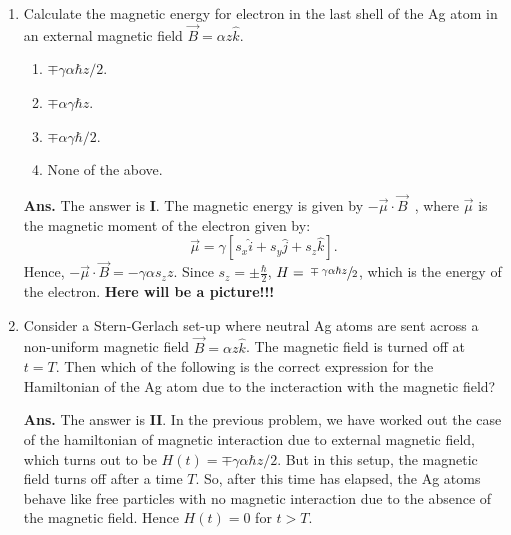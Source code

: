 \documentclass[12pt]{article}
\newcommand\tbf[1]{\textbf{#1}}
\newcommand\hhalf{\frac{\hbar}{2}}
\newcommand\tans{\tbf{Ans. }}
\newcommand\none{None of the above.}
\newcommand\sg{Stern-Gerlach }
\newcommand\h[1]{\hat{#1}}
\newcommand\dprod[2]{\vec{#1}\cdot\vec{#2}}
\begin{document}
\begin{enumerate}[\bf 1.]
\vspace{1cm}
\item Calculate the magnetic energy for electron in the last shell of the Ag atom in an external magnetic field $\vec{B} = \alpha z \h{k}$. 
\begin{enumerate}[\bf I.]
	\item $\mp {\gamma\alpha \hbar z}/{2}$.
	\item $\mp \alpha\gamma\hbar z$.
	\item $\mp {\alpha \gamma \hbar}/{2}$.
	\item \none
\end{enumerate}
\vspace{0.5cm}
\tans The answer is \tbf{I}. The magnetic energy is given by $-\dprod{\mu}{B}$~, where $\vec{\mu}$ is the magnetic moment of the electron given by:
$$
\vec{\mu} = \gamma \left[s_x\h{i}+s_y\h{j}+s_z\h{k}\right].
$$
Hence, $- \dprod{\mu}{B} = -\gamma \alpha s_z z$. Since $s_z = \pm \hhalf$, $H = \sfrac{\mp \gamma\alpha \hbar z}{2}$, which is the energy of the electron.
\vskip 1cm
\tbf{Here will be a picture!!!}
\newpage
\item \label{prb:t_var_h} Consider a \sg set-up where neutral Ag atoms are sent across a non-uniform magnetic field $\vec{B} = \alpha z \h{k}$. The magnetic field is turned off at ~$t=T$. Then which of the following is the correct expression for the Hamiltonian of the Ag atom due to the incteraction with the magnetic field?
\vspace{0.5cm}
\tans The answer is \tbf{II}. In the previous problem, we have worked out the case of the hamiltonian of magnetic interaction due to external magnetic field, which turns out to be $H(t) = \mp \gamma \alpha \hbar z / 2$. But in this setup, the magnetic field turns off after a time $T$. So, after this time has elapsed, the Ag atoms behave like free particles with no magnetic interaction due to the absence of the magnetic field. Hence $H(t) = 0$ for $t > T$.

\end{enumerate}
\end{document}
